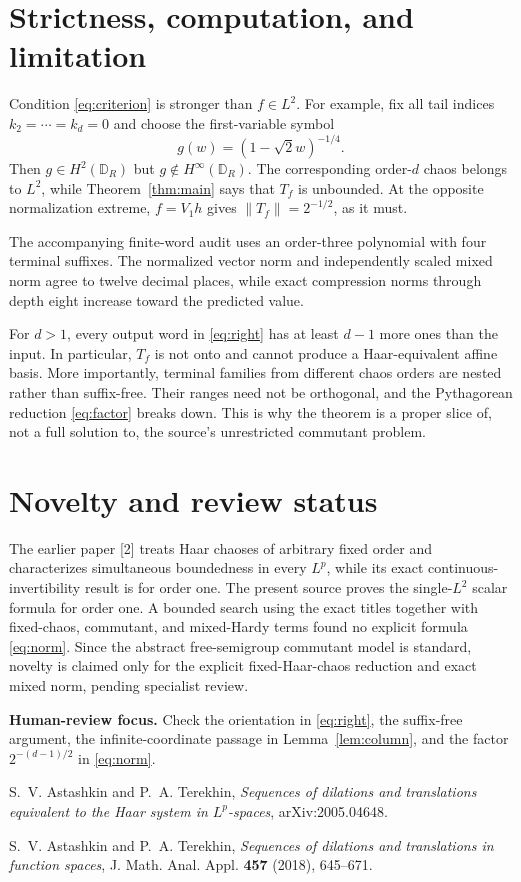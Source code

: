 \documentclass[11pt]{article}
\newcommand{\D}{\mathbb D}
\begin{document}
\small
\section{Strictness, computation, and limitation}

Condition \eqref{eq:criterion} is stronger than $f\in L^2$.  For example,
fix all tail indices $k_2=\cdots=k_d=0$ and choose the first-variable symbol
\[
 g(w)=(1-\sqrt2w)^{-1/4}.
\]
Then $g\in H^2(\D_R)$ but $g\notin H^\infty(\D_R)$.  The corresponding
order-$d$ chaos belongs to $L^2$, while Theorem~\ref{thm:main} says that
$T_f$ is unbounded.  At the opposite normalization extreme,
$f=V_1h$ gives $\|T_f\|=2^{-1/2}$, as it must.

The accompanying finite-word audit uses an order-three polynomial with four
terminal suffixes.  The normalized vector norm and independently scaled
mixed norm agree to twelve decimal places, while exact compression norms
through depth eight increase toward the predicted value.

For $d>1$, every output word in \eqref{eq:right} has at least $d-1$ more
ones than the input.  In particular, $T_f$ is not onto and cannot produce a
Haar-equivalent affine basis.  More importantly, terminal families from
different chaos orders are nested rather than suffix-free.  Their ranges
need not be orthogonal, and the Pythagorean reduction \eqref{eq:factor}
breaks down.  This is why the theorem is a proper slice of, not a full
solution to, the source's unrestricted commutant problem.

\section{Novelty and review status}

The earlier paper \textup{[2]} treats Haar chaoses of arbitrary fixed order
and characterizes simultaneous boundedness in every $L^p$, while its exact
continuous-invertibility result is for order one.  The present source proves
the single-$L^2$ scalar formula for order one.  A bounded search using the
exact titles together with fixed-chaos, commutant, and mixed-Hardy terms
found no explicit formula \eqref{eq:norm}.  Since the abstract
free-semigroup commutant model is standard, novelty is claimed only for the
explicit fixed-Haar-chaos reduction and exact mixed norm, pending specialist
review.

\medskip
\noindent\textbf{Human-review focus.}
Check the orientation in \eqref{eq:right}, the suffix-free argument, the
infinite-coordinate passage in Lemma~\ref{lem:column}, and the factor
$2^{-(d-1)/2}$ in \eqref{eq:norm}.

\medskip
{}\par\smallskip
\noindent[1] S.~V. Astashkin and P.~A. Terekhin,
\emph{Sequences of dilations and translations equivalent to the Haar system
in $L^p$-spaces}, arXiv:2005.04648.\par
\smallskip
\noindent[2] S.~V. Astashkin and P.~A. Terekhin,
\emph{Sequences of dilations and translations in function spaces},
J. Math. Anal. Appl. \textbf{457} (2018), 645--671.\par
\end{document}
